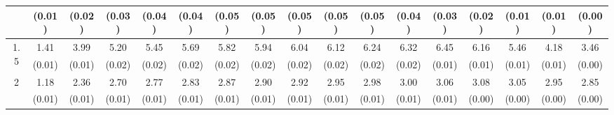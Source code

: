 \documentclass[12pt]{article}  %
\theoremstyle{plain}
\begin{document}
\begin{sidewaystable}[htbp]
\begin{tabular}{ccccccccccccccccc}
                      &  (0.01)& (0.02)& (0.03)& (0.04)& (0.04)& (0.05)& (0.05)& (0.05)& (0.05)&  (0.05)&  (0.04)&  (0.03)&  (0.02)&  (0.01)&  (0.01)&     (0.00)\\ \hline                                                                                                                                                                                                                                                                                    
\multirow{2}{*}{1.5}  &1.41 &3.99 & 5.20&  5.45  & 5.69 &  5.82  & 5.94  & 6.04  & 6.12 & 6.24 & 6.32 & 6.45 & 6.16 & 5.46 & 4.18 & 3.46\\
                      &  (0.01)& (0.01)& (0.02)& (0.02)& (0.02)& (0.02)& (0.02)& (0.02)& (0.02)&  (0.02)&  (0.02)&  (0.01)&  (0.01)&  (0.01)&  (0.01)&     (0.00)\\ \hline                                                                                                                                                                                                                                                                                    
\multirow{2}{*}{2}  &1.18& 2.36 & 2.70 & 2.77 &  2.83 & 2.87  & 2.90  & 2.92  & 2.95 & 2.98 & 3.00 & 3.06 & 3.08 & 3.05 & 2.95 & 2.85\\
                      &  (0.01)& (0.01)& (0.01)& (0.01)& (0.01)& (0.01)& (0.01) &(0.01) &(0.01)&  (0.01)&  (0.01)&  (0.01)&  (0.00)&  (0.00)&  (0.00)&     (0.00)\\ \hline                                                                                                                                                                                                                                                                                    
\end{tabular}
\end{sidewaystable}
\end{document}
